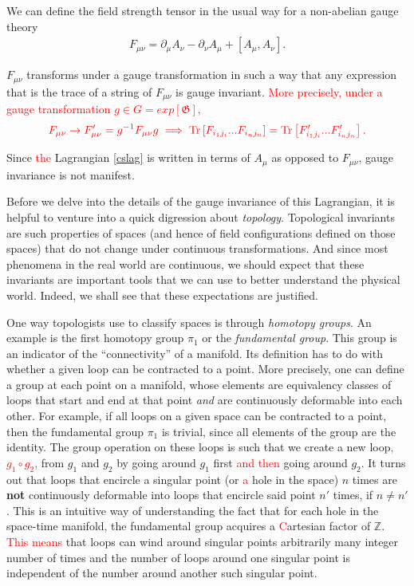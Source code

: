 We can define the field strength tensor in the usual way for a non-abelian gauge theory
\begin{align}
    F_{\mu \nu} = \partial_{\mu}A_{\nu} - \partial_{\nu} A_{\mu} + [A_{\mu}, A_{\nu}].
\end{align}




    $F_{\mu \nu}$ transforms under a gauge transformation in such a way that any expression that is the trace of a string of $F_{\mu \nu}$ is gauge invariant. \textcolor{red}{More precisely, under a gauge transformation $g\in G=exp\left[\mathfrak{G} \right]$, }
\begin{align}
    \textcolor{red}{F_{\mu \nu} \rightarrow F'_{\mu\nu} = g^{-1} F_{\mu \nu} g \implies \mathrm{Tr}\left[ F_{i_1 j_i} ...F_{i_n j_n} \right]= \mathrm{Tr} \left[F'_{i_1 j_i} ...F'_{i_n j_n} \right].}
\end{align}

    Since \textcolor{red}{the} Lagrangian \textcolor{red}{\eqref{cslag}} is written in terms of $A_{\mu}$ as opposed to $F_{\mu \nu}$, gauge invariance is not manifest.


    Before we delve into the details of the gauge invariance of this Lagrangian, it is helpful to venture into a quick digression about \textit{topology}. Topological invariants are such properties of spaces (and hence of field configurations defined on those spaces) that do not change under continuous transformations. And since most phenomena in the real world are continuous, we should expect that these invariants are important tools that we can use to better understand the physical world. Indeed, we shall see that these expectations are justified. 

    One way topologists use to classify spaces is through \textit{homotopy groups}. An example is the first homotopy group $\pi_1$ or the \textit{fundamental group}. This group is an indicator of the ``connectivity'' of a manifold. Its definition has to do with whether a given loop can be contracted to a point. More precisely, one can define a group at each point on a manifold, whose elements are equivalency classes of loops that start and end at that point \textit{and} are continuously deformable into each other. For example, if all loops on a given space can be contracted to a point, then the fundamental group $\pi_1$ is trivial, since all elements of the group are the identity. The group operation on these loops is such that we create a new loop\textcolor{red}{, $g_1 \circ g_2$,} from $g_1$ and $g_2$ by going around $g_1$ first \textcolor{red}{ and then} going around $g_2$. It turns out that loops that encircle a singular point (or \textcolor{red}{a} hole in the space) $n$ times are \textbf{not} continuously deformable into loops that encircle said point $n'$ times, if $n \neq n'$. This is an intuitive way of understanding the fact that for each hole in the space-time manifold, the fundamental group acquires a \textcolor{red}{C}artesian factor of $\mathbb{Z}$. \textcolor{red}{This means} that loops can wind around singular points arbitrarily many integer number of times and the number of loops around one singular point is independent of the number around another such singular point.

